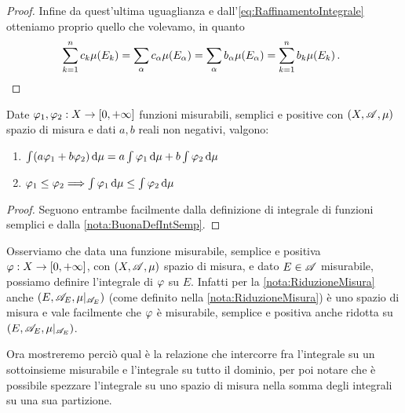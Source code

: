 \begin{proof}
	Infine da quest'ultima uguaglianza e dall'\cref{eq:RaffinamentoIntegrale} otteniamo proprio quello che volevamo, in quanto
	\begin{equation*}
		\sum_{k=1}^n c_k \mu(E_k)=\sum_\alpha c_\alpha\mu(E_\alpha)=\sum_\alpha b_\alpha\mu(E_\alpha)=\sum_{k=1}^n b_k \mu(E_k)\, \text{. }
	\end{equation*}
\end{proof}

\begin{proposition}\label{prop:IntegraleSemplici}
	Date $\varphi_1,\varphi_2:X\to[0,+\infty]$ funzioni misurabili, semplici e positive con $(X,\mathscr A,\mu)$ spazio di misura e dati $a,b$ reali non negativi, valgono:
	\begin{enumerate}
		\item $\int (a\varphi_1+b\varphi_2)\,\mathrm d\mu=a\int \varphi_1\,\mathrm d\mu+b\int \varphi_2\,\mathrm d\mu$ \label{PIS:add}
		\item $\varphi_1\le \varphi_2\Longrightarrow \int \varphi_1\,\mathrm d\mu\le \int \varphi_2\,\mathrm d\mu$ \label{PIS:mono}
	\end{enumerate}
\end{proposition}
\begin{proof}
	Seguono entrambe facilmente dalla definizione di integrale di funzioni semplici e dalla \cref{nota:BuonaDefIntSemp}.
\end{proof}

\begin{remark}
	Osserviamo che data una funzione misurabile, semplice e positiva $\varphi:X\to[0,+\infty]$, con $(X,\mathscr A,\mu)$ spazio di misura, e dato $E\in\mathscr A$ misurabile, possiamo definire l'integrale di $\varphi$ su $E$. Infatti per la \cref{nota:RiduzioneMisura} anche $(E,\mathscr A_E,\mu|_{\mathscr A_E})$ (come definito nella \cref{nota:RiduzioneMisura}) è uno spazio di misura e vale facilmente che $\varphi$ è misurabile, semplice e positiva anche ridotta su $(E,\mathscr A_E,\mu|_{\mathscr A_E})$.
\end{remark}

Ora mostreremo perciò qual è la relazione che intercorre fra l'integrale su un sottoinsieme misurabile e l'integrale su tutto il dominio, per poi notare che è possibile spezzare l'integrale su uno spazio di misura nella somma degli integrali su una sua partizione.

